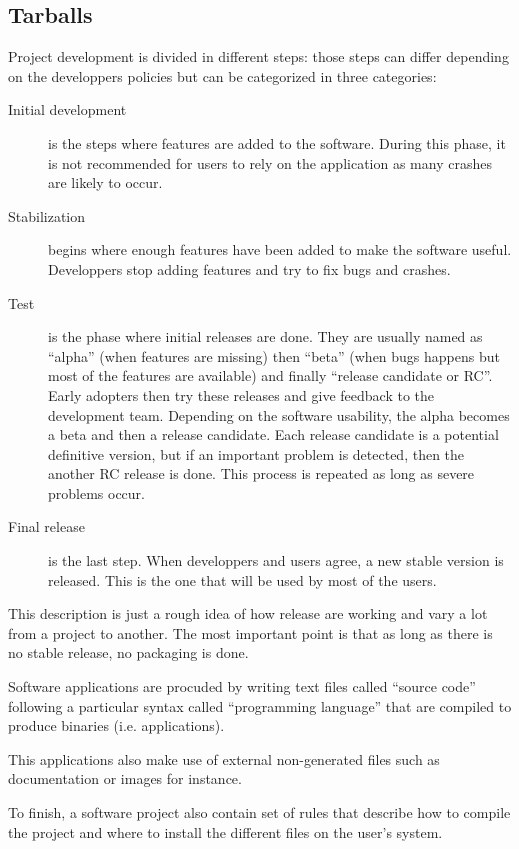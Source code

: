 \subsection{Tarballs}

Project development is divided in different steps: those steps can
differ depending on the developpers policies but can be categorized in
three categories:
\begin{description}
\item[Initial development] is the steps where features are added to
  the software. During this phase, it is not recommended for users to
  rely on the application as many crashes are likely to occur.
\item[Stabilization] begins where enough features have been added to
  make the software useful. Developpers stop adding features and try
  to fix bugs and crashes.
\item[Test] is the phase where initial releases are done. They are
  usually named as ``alpha'' (when features are missing) then ``beta''
  (when bugs happens but most of the features are available) and
  finally ``release candidate or RC''. Early adopters then try these
  releases and give feedback to the development team. Depending on the
  software usability, the alpha becomes a beta and then a release
  candidate. Each release candidate is a potential definitive version,
  but if an important problem is detected, then the another RC release
  is done. This process is repeated as long as severe problems occur.
\item[Final release] is the last step. When developpers and users
  agree, a new stable version is released. This is the one that will
  be used by most of the users.
\end{description}

This description is just a rough idea of how release are working and
vary a lot from a project to another. The most important point is that
as long as there is no stable release, no packaging is done.


Software applications are procuded by writing text files called
``source code'' following a particular syntax called ``programming
language'' that are compiled to produce binaries (i.e. applications).

This applications also make use of external non-generated files such
as documentation or images for instance.

To finish, a software project also contain set of rules that describe
how to compile the project and where to install the different files on
the user's system.


